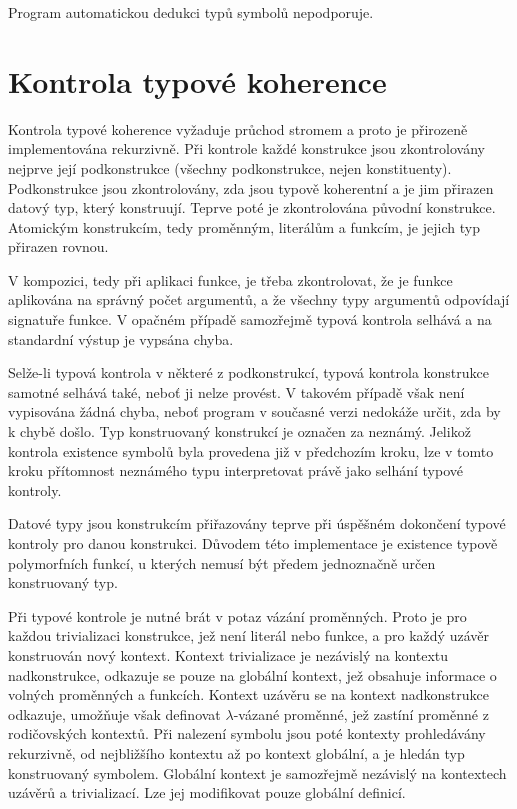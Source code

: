 \documentclass{article}
\begin{document}
Program automatickou dedukci typů symbolů nepodporuje.

\section{Kontrola typové koherence}

Kontrola typové koherence vyžaduje průchod stromem a proto je přirozeně implementována rekurzivně. Při
kontrole každé konstrukce jsou zkontrolovány nejprve její podkonstrukce (všechny podkonstrukce, nejen
konstituenty). Podkonstrukce jsou zkontrolovány, zda jsou typově koherentní a je jim přirazen datový
typ, který konstruují. Teprve poté je zkontrolována původní konstrukce. Atomickým konstrukcím, tedy
proměnným, literálům a funkcím, je jejich typ přirazen rovnou.

V kompozici, tedy při aplikaci funkce, je třeba zkontrolovat, že je funkce aplikována na správný počet
argumentů, a že všechny typy argumentů odpovídají signatuře funkce. V opačném případě samozřejmě typová
kontrola selhává a na standardní výstup je vypsána chyba.

Selže-li typová kontrola v některé z podkonstrukcí, typová kontrola konstrukce samotné selhává také,
neboť ji nelze provést. V takovém případě však není vypisována žádná chyba, neboť program v současné
verzi nedokáže určit, zda by k chybě došlo. Typ konstruovaný konstrukcí je označen za neznámý. Jelikož
kontrola existence symbolů byla provedena již v předchozím kroku, lze v tomto kroku přítomnost neznámého
typu interpretovat právě jako selhání typové kontroly.

Datové typy jsou konstrukcím přiřazovány teprve při úspěšném dokončení typové kontroly pro danou konstrukci.
Důvodem této implementace je existence typově polymorfních funkcí, u kterých nemusí být předem jednoznačně
určen konstruovaný typ.

Při typové kontrole je nutné brát v potaz vázání proměnných. Proto je pro každou trivializaci konstrukce, jež
není literál nebo funkce, a pro každý uzávěr konstruován nový kontext. Kontext trivializace je nezávislý na
kontextu nadkonstrukce, odkazuje se pouze na globální kontext, jež obsahuje informace o volných proměnných
a funkcích. Kontext uzávěru se na kontext nadkonstrukce odkazuje, umožňuje však definovat $\lambda$-vázané proměnné,
jež zastíní proměnné z rodičovských kontextů. Při nalezení symbolu jsou poté kontexty prohledávány rekurzivně,
od nejbližšího kontextu až po kontext globální, a je hledán typ konstruovaný symbolem. Globální kontext je
samozřejmě nezávislý na kontextech uzávěrů a trivializací. Lze jej modifikovat pouze globální definicí.
\end{document}
